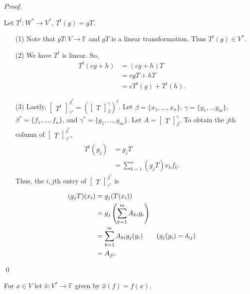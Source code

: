 \documentclass[12pt]{article}
\newenvironment{sol}
    {\emph{Proof.}
    }
    {
    \qed
    }
\begin{document}
\begin{sol}
Let $T^t : W^* \to V^*$, $T^t(g) = gT$. 
\begin{itemize}
    \item[(1)] Note that $gT : V \to \mathbb{F}$ and $gT$ is a linear transformation. Thus $T^t(g) \in V^*$. 
    
    \item[(2)] We have $T^t$ is linear. So,
    \begin{align*}
        T^t(cg + h) &= (cg+h)T \\
        &= cgT + hT \\
        &= cT^t(g) + T^t(h).
    \end{align*}
    
    \item[(3)] Lastly, $\begin{bmatrix}
    T^t
    \end{bmatrix}_{\gamma^*}^{\beta^*} = \left( \begin{bmatrix}
    T
    \end{bmatrix}_\beta^\gamma \right)^t$. Let $\beta = \{x_1, \dots, x_n\}$, $\gamma = \{y_1, \dots y_m\}$, $\beta^* = \{f_1, \dots, f_n\}$, and $\gamma^* = \{g_1, \dots, g_m\}$. Let $A = \begin{bmatrix}
    T
    \end{bmatrix}_\beta^\gamma$. To obtain the $j$th column of $\begin{bmatrix}
    T
    \end{bmatrix}_{\gamma^*}^{\beta^*}$, \begin{align*}
        T^t(g_j) &= g_jT \\
        &= \sum_{k = 1}^n (g_jT)x_kf_k. 
    \end{align*} Thus, the $i,j$th entry of $\begin{bmatrix}
    T
    \end{bmatrix}_{\gamma^*}^{\beta^*}$ is
    \begin{align*}
        (g_jT)(x_i) &= g_j(T(x_i)) \\
        &= g_j\left(\sum_{k = 1}^mA_{ki}y_i\right) \\
        &= \sum_{k = 1}^mA_{ki}g_j(y_i) \tag*{($g_j(y_i) = \delta_{ij}$)} \\
        &= A_{ji}. 
    \end{align*}
\end{itemize}
\end{sol}

For $x \in V$ let $\hat{x} : V^* \to \mathbb{F}$ given by $\hat{x}(f) = f(x)$.
\end{document}
